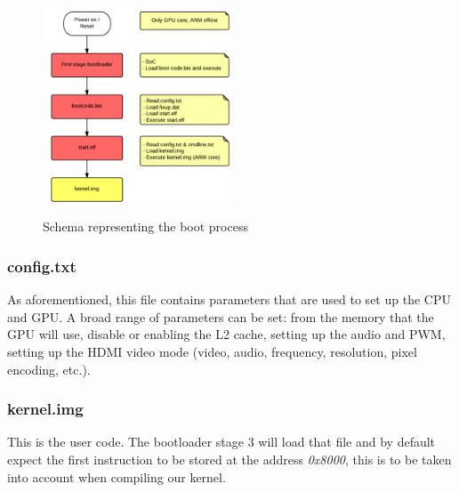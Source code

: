 \begin{figure}[H]
\begin{center}
\includegraphics[width=0.5\textwidth]{includes/figures/chapter1_booting_process.png}  \\[0.5 cm]
\caption{Schema representing the boot process}
\end{center}
\end{figure}

\subsubsection{config.txt}
As aforementioned, this file contains parameters that are used to set up the CPU and GPU. A broad range of parameters can be set\cite{config_txt}: from the memory that the GPU will use, disable or enabling the L2 cache, setting up the audio and PWM, setting up the HDMI video mode (video, audio, frequency, resolution, pixel encoding, etc.).

\subsubsection{kernel.img}
This is the user code. The bootloader stage 3 will load that file and by default expect the first instruction to be stored at the address \textit{0x8000}, this is to be taken into account when compiling our kernel.

